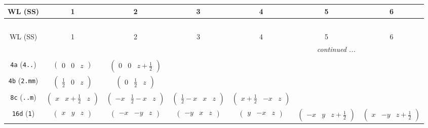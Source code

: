 \documentclass[fleqn,9pt,landscape]{jsarticle}
\begin{document}
\begin{center}
\renewcommand{\arraystretch}{1.2}
\begin{longtable}{ccccccc}
 \hline \hline
WL (SS) & 1 & 2 & 3 & 4 & 5 & 6 \\ \hline \endfirsthead

\multicolumn{6}{l}{\tablename\ \thetable{}} \\
 \hline \hline
WL (SS) & 1 & 2 & 3 & 4 & 5 & 6 \\ \hline \endhead

 \hline \hline
\multicolumn{6}{r}{\footnotesize\it continued ...} \\ \endfoot

 \hline \hline
\multicolumn{6}{r}{} \\ \endlastfoot

{\tt 4a} ({\tt 4..}) & $ \begin{pmatrix} 0 & 0 & z \end{pmatrix} $ & $ \begin{pmatrix} 0 & 0 & z + \frac{1}{2} \end{pmatrix} $ & $  $ & $  $ & $  $ & $  $ \\ \hline
{\tt 4b} ({\tt 2.mm}) & $ \begin{pmatrix} \frac{1}{2} & 0 & z \end{pmatrix} $ & $ \begin{pmatrix} 0 & \frac{1}{2} & z \end{pmatrix} $ & $  $ & $  $ & $  $ & $  $ \\ \hline
{\tt 8c} ({\tt ..m}) & $ \begin{pmatrix} x & x + \frac{1}{2} & z \end{pmatrix} $ & $ \begin{pmatrix} - x & \frac{1}{2} - x & z \end{pmatrix} $ & $ \begin{pmatrix} \frac{1}{2} - x & x & z \end{pmatrix} $ & $ \begin{pmatrix} x + \frac{1}{2} & - x & z \end{pmatrix} $ & $  $ & $  $ \\ \hline
{\tt 16d} ({\tt 1}) & $ \begin{pmatrix} x & y & z \end{pmatrix} $ & $ \begin{pmatrix} - x & - y & z \end{pmatrix} $ & $ \begin{pmatrix} - y & x & z \end{pmatrix} $ & $ \begin{pmatrix} y & - x & z \end{pmatrix} $ & $ \begin{pmatrix} - x & y & z + \frac{1}{2} \end{pmatrix} $ & $ \begin{pmatrix} x & - y & z + \frac{1}{2} \end{pmatrix} $ \\

\end{longtable}
\end{center}
\end{document}
